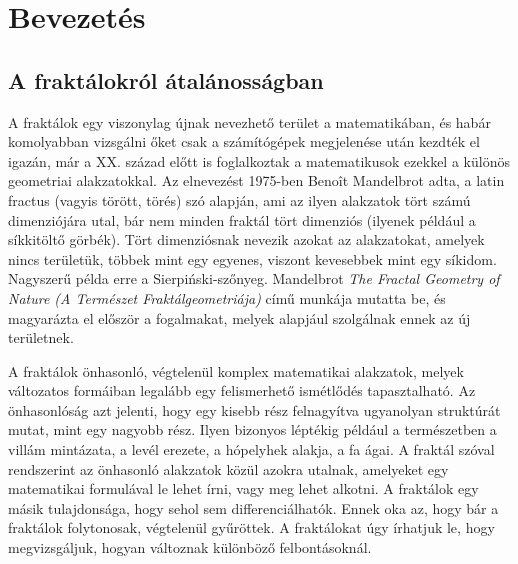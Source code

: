 \chapter*{Bevezetés}
\section*{A fraktálokról átalánosságban}
A fraktálok egy viszonylag újnak nevezhető terület a matematikában, és habár komolyabban vizsgálni őket csak a számítógépek megjelenése után kezdték el igazán, már a XX. század előtt is foglalkoztak a matematikusok ezekkel a különös geometriai alakzatokkal. Az elnevezést 1975-ben Benoît Mandelbrot adta, a latin fractus (vagyis törött, törés) szó alapján, ami az ilyen alakzatok tört számú dimenziójára utal, bár nem minden fraktál tört dimenziós (ilyenek például a síkkitöltő görbék). \cite{fraktal}
Tört dimenziósnak nevezik azokat az alakzatokat, amelyek nincs területük, többek mint egy egyenes, viszont kevesebbek mint egy síkidom. Nagyszerű példa erre a Sierpiński-szőnyeg. Mandelbrot {\it The Fractal Geometry of Nature (A Természet Fraktálgeometriája)} című munkája mutatta be, és magyarázta el először a fogalmakat, melyek alapjául szolgálnak ennek az új területnek. \cite{fraktal-wiki}
\par A fraktálok önhasonló, végtelenül komplex matematikai alakzatok, melyek változatos formáiban legalább egy felismerhető ismétlődés tapasztalható. Az önhasonlóság azt jelenti, hogy egy kisebb rész felnagyítva ugyanolyan struktúrát mutat, mint egy nagyobb rész. Ilyen bizonyos léptékig például a természetben a villám mintázata, a levél erezete, a hópelyhek alakja, a fa ágai. A fraktál szóval rendszerint az önhasonló alakzatok közül azokra utalnak, amelyeket egy matematikai formulával le lehet írni, vagy meg lehet alkotni. \cite{fraktal} A fraktálok egy másik tulajdonsága, hogy sehol sem differenciálhatók. Ennek oka az, hogy bár a fraktálok folytonosak, végtelenül gyűröttek. A fraktálokat úgy írhatjuk le, hogy megvizsgáljuk, hogyan változnak különböző felbontásoknál. 
